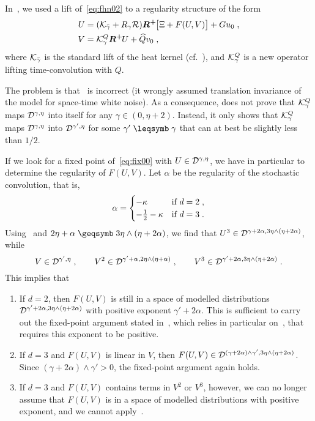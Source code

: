 \documentclass[reqno,11pt]{article}
\def\Rplus{\boldsymbol{R^+}\hspace{-.1em}}
\begin{document}
In~\cite{BK2016}, we used a lift of~\eqref{eq:fhn02} to a regularity structure
of the form 
\begin{align}
\nonumber
U &= (\cK_{\bar\gamma}+R_\gamma\cR)\Rplus \bigbrak{\Xi+F(U,V)} + Gu_0\;, \\
V &= \cK^Q_\gamma\Rplus U + \widehat Qv_0\;, 
\label{eq:fix00} 
\end{align}
where ${\mathcal K}_{\bar\gamma}$ is the standard lift of the heat kernel 
(cf.~\cite[Sect.~5]{Hairer2014}), and ${\mathcal K}^Q_\gamma$ is a new operator lifting 
time-convolution with $Q$. 

The problem is that~\cite[Lemma~4.8]{BK2016} is incorrect (it wrongly assumed
translation invariance of the model for space-time white noise). As a
consequence, \cite[Proposition~4.11]{BK2016} does not prove that ${\mathcal K}^Q_\gamma$
maps ${\mathcal D}^{\gamma,\eta}$ into itself for any $\gamma\in(0,\eta+2)$. Instead, it
only shows that ${\mathcal K}^Q_\gamma$ maps ${\mathcal D}^{\gamma,\eta}$ into
${\mathcal D}^{\gamma',\eta}$ for some $\gamma'\leqs\gamma$ that can at best be slightly
less than $1/2$. 

If we look for a fixed point of~\eqref{eq:fix00} with $U\in{\mathcal D}^{\gamma,\eta}$,
we have in particular to determine the regularity of $F(U,V)$.
Let $\alpha$ be the regularity of the stochastic convolution, that is, 
\begin{equation}
 \alpha = 
 \begin{cases}
  - \kappa & \text{if $d=2$\;,} \\
  -\frac12 - \kappa & \text{if $d=3$\;.}
 \end{cases}
\end{equation} 
Using~\cite[Prop.~6.12]{Hairer2014} and $2\eta+\alpha 
\geqs 3\eta\wedge(\eta+2\alpha)$, we find that $U^3 \in {\mathcal D}^{\gamma+2\alpha,
3\eta\wedge(\eta+2\alpha)}$, while 
\begin{equation}
 V \in {\mathcal D}^{\gamma',\eta}\;, 
 \qquad 
 V^2 \in {\mathcal D}^{\gamma'+\alpha, 2\eta\wedge(\eta+\alpha)}\;, 
 \qquad
 V^3 \in {\mathcal D}^{\gamma'+2\alpha, 3\eta\wedge(\eta+2\alpha)}\;.
\end{equation} 
This implies that 
\begin{enumerate}
\item 	If $d=2$, then $F(U,V)$ is still in a space of modelled distributions
${\mathcal D}^{\gamma'+2\alpha, 3\eta\wedge(\eta+2\alpha)}$ with positive exponent
$\gamma'+2\alpha$. This is sufficient to carry out the fixed-point argument
stated in~\cite[Prop.~6.5]{BK2016}, which relies in particular
on~\cite[Thm.~7.1]{Hairer2014}, that requires this exponent to be positive.

\item 	If $d=3$ and $F(U,V)$ is linear in $V$, then $F(U,V)\in
{\mathcal D}^{(\gamma+2\alpha)\wedge\gamma', 3\eta\wedge(\eta+2\alpha)}$. Since 
$(\gamma+2\alpha)\wedge\gamma' > 0$, the fixed-point argument again holds.

\item 	If $d=3$ and $F(U,V)$ contains terms in $V^2$ or $V^3$, however, we can
no longer assume that $F(U,V)$ is in a space of modelled distributions with
positive exponent, and we cannot apply~\cite[Thm.~7.1]{Hairer2014}.  
\end{enumerate}
\end{document}
